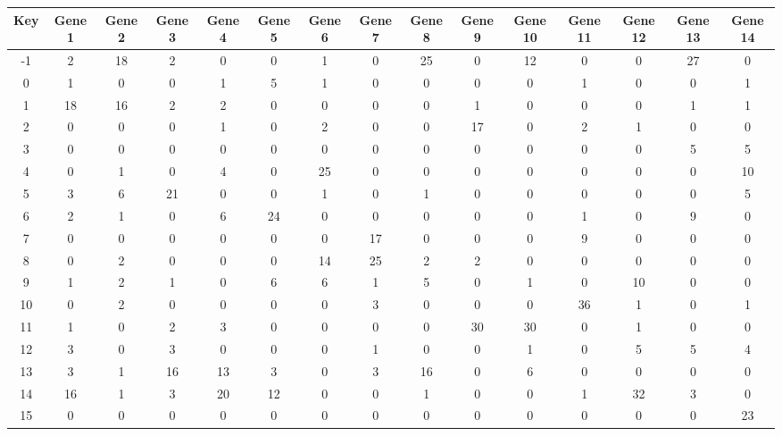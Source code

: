 \begin{tabular}{|c|c|c|c|c|c|c|c|c|c|c|c|c|c|c|}
\hline
Key & Gene 1 & Gene 2 & Gene 3 & Gene 4 & Gene 5 & Gene 6 & Gene 7 & Gene 8 & Gene 9 & Gene 10 & Gene 11 & Gene 12 & Gene 13 & Gene 14 \\
\hline
-1 & 2 & 18 & 2 & 0 & 0 & 1 & 0 & 25 & 0 & 12 & 0 & 0 & 27 & 0 \\
0 & 1 & 0 & 0 & 1 & 5 & 1 & 0 & 0 & 0 & 0 & 1 & 0 & 0 & 1 \\
1 & 18 & 16 & 2 & 2 & 0 & 0 & 0 & 0 & 1 & 0 & 0 & 0 & 1 & 1 \\
2 & 0 & 0 & 0 & 1 & 0 & 2 & 0 & 0 & 17 & 0 & 2 & 1 & 0 & 0 \\
3 & 0 & 0 & 0 & 0 & 0 & 0 & 0 & 0 & 0 & 0 & 0 & 0 & 5 & 5 \\
4 & 0 & 1 & 0 & 4 & 0 & 25 & 0 & 0 & 0 & 0 & 0 & 0 & 0 & 10 \\
5 & 3 & 6 & 21 & 0 & 0 & 1 & 0 & 1 & 0 & 0 & 0 & 0 & 0 & 5 \\
6 & 2 & 1 & 0 & 6 & 24 & 0 & 0 & 0 & 0 & 0 & 1 & 0 & 9 & 0 \\
7 & 0 & 0 & 0 & 0 & 0 & 0 & 17 & 0 & 0 & 0 & 9 & 0 & 0 & 0 \\
8 & 0 & 2 & 0 & 0 & 0 & 14 & 25 & 2 & 2 & 0 & 0 & 0 & 0 & 0 \\
9 & 1 & 2 & 1 & 0 & 6 & 6 & 1 & 5 & 0 & 1 & 0 & 10 & 0 & 0 \\
10 & 0 & 2 & 0 & 0 & 0 & 0 & 3 & 0 & 0 & 0 & 36 & 1 & 0 & 1 \\
11 & 1 & 0 & 2 & 3 & 0 & 0 & 0 & 0 & 30 & 30 & 0 & 1 & 0 & 0 \\
12 & 3 & 0 & 3 & 0 & 0 & 0 & 1 & 0 & 0 & 1 & 0 & 5 & 5 & 4 \\
13 & 3 & 1 & 16 & 13 & 3 & 0 & 3 & 16 & 0 & 6 & 0 & 0 & 0 & 0 \\
14 & 16 & 1 & 3 & 20 & 12 & 0 & 0 & 1 & 0 & 0 & 1 & 32 & 3 & 0 \\
15 & 0 & 0 & 0 & 0 & 0 & 0 & 0 & 0 & 0 & 0 & 0 & 0 & 0 & 23 \\
\hline
\end{tabular}